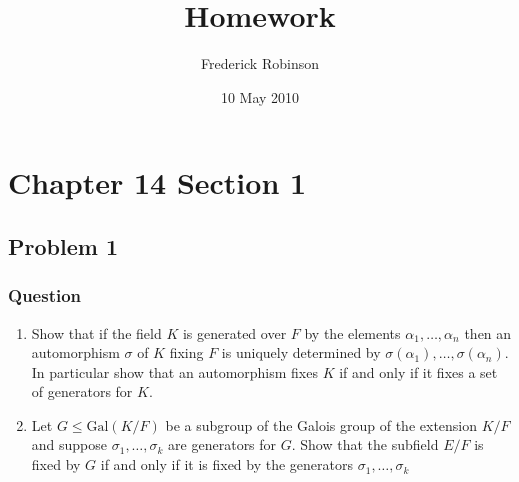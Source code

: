 \documentclass[10pt]{article}
\title{Homework}
\author{Frederick Robinson}
\date{10 May 2010}
\begin{document}

   \maketitle

\setcounter{tocdepth}{2} 


\section{Chapter 14 Section 1}
\subsection{Problem 1}
\subsubsection{Question}
\begin{enumerate}
\item Show that if the field $K$ is generated over $F$ by the elements $\alpha_1, \dots, \alpha_n$ then an automorphism $\sigma$ of $K$ fixing $F$ is uniquely determined by $\sigma(\alpha_1), \dots, \sigma(\alpha_n)$. In particular show that an automorphism fixes $K$ if and only if it fixes a set of generators for $K$.
\item Let $G \leq \mathrm{Gal}(K / F)$ be a subgroup of the Galois group of the extension $K/F$ and suppose $\sigma_1, \dots, \sigma_k$ are generators for $G$. Show that the subfield $E/F$ is fixed by $G$ if and only if it is fixed by the generators $\sigma_1, \dots, \sigma_k$
\end{enumerate}
\end{document}
